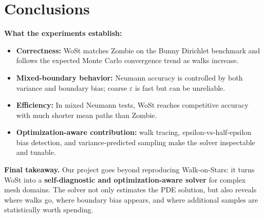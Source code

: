 \documentclass[11pt]{article}
\begin{document}
\section{Conclusions}

\begin{tcolorbox}[colback=lightbg,colframe=accent,boxrule=0.5pt,arc=2pt,left=6pt,right=6pt,top=4pt,bottom=4pt]
\textbf{What the experiments establish:}
\begin{itemize}
  \item \textbf{Correctness:} WoSt matches Zombie on the Bunny Dirichlet benchmark and follows the expected Monte Carlo convergence trend as walks increase.
  \item \textbf{Mixed-boundary behavior:} Neumann accuracy is controlled by both variance and boundary bias; coarse $\varepsilon$ is fast but can be unreliable.
  \item \textbf{Efficiency:} In mixed Neumann tests, WoSt reaches competitive accuracy with much shorter mean paths than Zombie.
  \item \textbf{Optimization-aware contribution:} walk tracing, epsilon-vs-half-epsilon bias detection, and variance-predicted sampling make the solver inspectable and tunable.
\end{itemize}
\end{tcolorbox}

\textbf{Final takeaway.} Our project goes beyond reproducing Walk-on-Stars: it turns WoSt into a \textbf{self-diagnostic and optimization-aware solver} for complex mesh domains.  The solver not only estimates the PDE solution, but also reveals where walks go, where boundary bias appears, and where additional samples are statistically worth spending.
\end{document}
